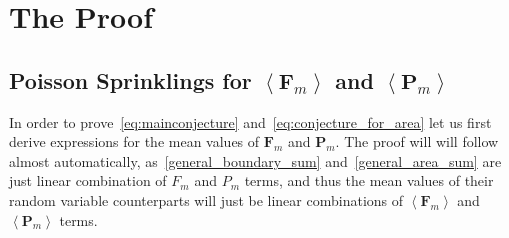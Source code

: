 \documentclass[12pt]{article}
\newcommand{\F}[1]{F_{#1}}
\renewcommand{\P}[1]{P_{#1}}
\newcommand{\BF}[1]{\mathbf{F}_{#1}}
\newcommand{\BP}[1]{\mathbf{P}_{#1}}
\begin{document}

\section{The Proof}

\subsection{Poisson Sprinklings for $\left\langle \BF{m}\right\rangle$ and $\left\langle \BP{m}\right\rangle$}

In order to prove~\eqref{eq:mainconjecture} and~\eqref{eq:conjecture_for_area} let us first derive expressions for the mean values of $\BF{m}$ and $\BP{m}$. The proof will will follow almost automatically, as~\eqref{general_boundary_sum} and~\eqref{general_area_sum} are just linear combination of $\F{m}$ and $\P{m}$ terms, and thus the mean values of their random variable counterparts will just be linear combinations of $\left\langle \BF{m}\right\rangle$ and $\left\langle \BP{m}\right\rangle$ terms.
\end{document}

